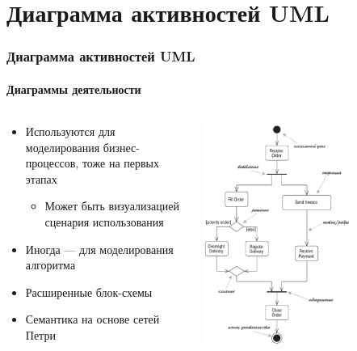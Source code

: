 \documentclass{../../slides-style}
\begin{document}
    \section{Диаграмма активностей UML}

    \begin{frame}
        \frametitle{Диаграмма активностей UML}
        \framesubtitle{Диаграммы деятельности}
        \begin{columns}
            \begin{column}{0.5\textwidth}
                \begin{itemize}
                    \item Используются для моделирования бизнес-процессов, тоже на первых этапах
                    \begin{itemize}
                        \item Может быть визуализацией сценария использования
                    \end{itemize}
                    \item Иногда --- для моделирования алгоритма
                    \item Расширенные блок-схемы
                    \item Семантика на основе сетей Петри
                \end{itemize}
            \end{column}
            \begin{column}{0.5\textwidth}
                \begin{center}
                    \includegraphics[width=0.7\textwidth]{activityDiagram.png}
                \end{center}
            \end{column}
        \end{columns}
    \end{frame}
\end{document}
